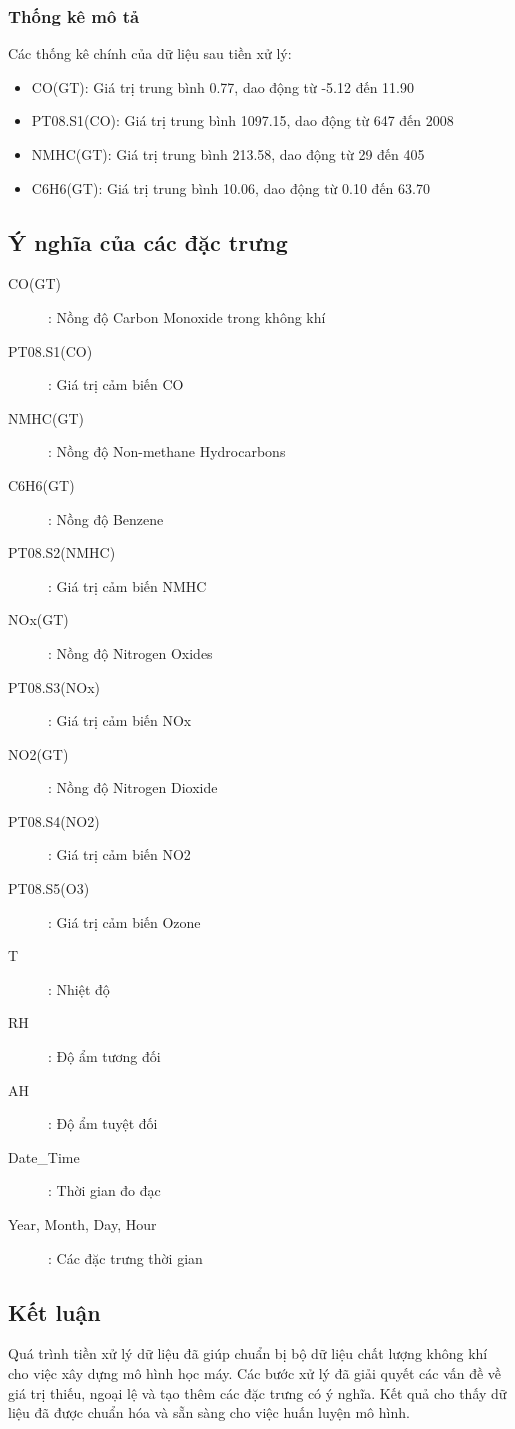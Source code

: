 \subsubsection{Thống kê mô tả}
\hspace{0.5cm}Các thống kê chính của dữ liệu sau tiền xử lý:
\begin{itemize}
    \item CO(GT): Giá trị trung bình 0.77, dao động từ -5.12 đến 11.90
    \item PT08.S1(CO): Giá trị trung bình 1097.15, dao động từ 647 đến 2008
    \item NMHC(GT): Giá trị trung bình 213.58, dao động từ 29 đến 405
    \item C6H6(GT): Giá trị trung bình 10.06, dao động từ 0.10 đến 63.70
\end{itemize}

\subsection{Ý nghĩa của các đặc trưng}

\begin{description}
    \item[CO(GT)]: Nồng độ Carbon Monoxide trong không khí
    \item[PT08.S1(CO)]: Giá trị cảm biến CO
    \item[NMHC(GT)]: Nồng độ Non-methane Hydrocarbons
    \item[C6H6(GT)]: Nồng độ Benzene
    \item[PT08.S2(NMHC)]: Giá trị cảm biến NMHC
    \item[NOx(GT)]: Nồng độ Nitrogen Oxides
    \item[PT08.S3(NOx)]: Giá trị cảm biến NOx
    \item[NO2(GT)]: Nồng độ Nitrogen Dioxide
    \item[PT08.S4(NO2)]: Giá trị cảm biến NO2
    \item[PT08.S5(O3)]: Giá trị cảm biến Ozone
    \item[T]: Nhiệt độ
    \item[RH]: Độ ẩm tương đối
    \item[AH]: Độ ẩm tuyệt đối
    \item[Date\_Time]: Thời gian đo đạc
    \item[Year, Month, Day, Hour]: Các đặc trưng thời gian
\end{description}

\subsection{Kết luận}
\hspace{0.5cm}Quá trình tiền xử lý dữ liệu đã giúp chuẩn bị bộ dữ liệu chất lượng không khí cho việc xây dựng mô hình học máy. Các bước xử lý đã giải quyết các vấn đề về giá trị thiếu, ngoại lệ và tạo thêm các đặc trưng có ý nghĩa. Kết quả cho thấy dữ liệu đã được chuẩn hóa và sẵn sàng cho việc huấn luyện mô hình.